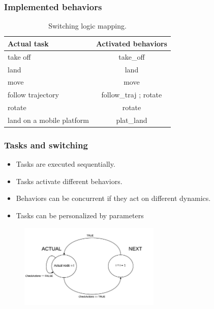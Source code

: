 \documentclass[xcolor=dvipsnames]{beamer}
\begin{document}
\begin{frame}
\frametitle{Implemented behaviors}
\begin{table}[h]
\centering
\begin{tabular}{l|c}
Actual task               & Activated behaviors   \\ \hline
take off                  & take\_off             \\
land                      & land                  \\
move                      & move                  \\
follow trajectory         & follow\_traj ; rotate \\
rotate                    & rotate                \\
land on a mobile platform & plat\_land           
\end{tabular}
\caption{Switching logic mapping.}
\label{tab:map}
\end{table}
\end{frame}

\begin{frame}
\frametitle{Tasks and switching}
\begin{itemize}
\item Tasks are executed sequentially.

\item Tasks activate different behaviors.

\item Behaviors can be concurrent if they act on different dynamics.

\item Tasks can be personalized by parameters

\end{itemize}
\begin{figure}
\centering
\includegraphics[width = 0.6\textwidth]{f/executioner.png}
\end{figure}

\end{frame}
\end{document}
